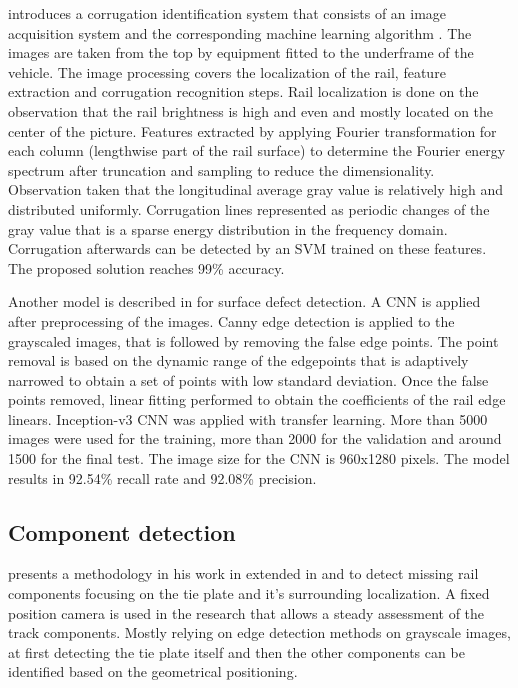 \documentclass[10pt, final]{article}
\begin{document}
			\citeauthor*{li_cyber-enabled_2018} introduces a corrugation identification system that consists of an image
			acquisition system and the corresponding machine learning algorithm \cite{li_cyber-enabled_2018}.
			The images are taken from the top by equipment fitted to the underframe of the vehicle.
			The image processing covers the localization of the rail, feature extraction and corrugation recognition steps.
			Rail localization is done on the observation that the rail brightness is high and even and mostly located on the
			center of the picture.
			Features extracted by applying Fourier transformation for each column (lengthwise part of the rail surface) to 
			determine the Fourier energy spectrum after truncation and sampling to reduce the dimensionality.
			Observation taken that the longitudinal average gray value is relatively high and distributed uniformly.
			Corrugation lines represented as periodic changes of the gray value that is a sparse energy distribution
			in the frequency domain.
			Corrugation afterwards can be detected by an SVM trained on these features.
			The proposed solution reaches 99\% accuracy.
			
			Another model is described in \cite{shang_detection_2018} for surface defect detection.
			A CNN is applied after preprocessing of the images.
			Canny edge detection is applied to the grayscaled images, that is followed by removing the false edge points.
			The point removal is based on the dynamic range of the edgepoints that is adaptively narrowed to obtain
			a set of points with low standard deviation.
			Once the false points removed, linear fitting performed to obtain the coefficients of the rail edge linears.
			Inception-v3 CNN was applied with transfer learning.
			More than 5000 images were used for the training, more than 2000 for the validation and around 1500 for the final test.
			The image size for the CNN is 960x1280 pixels.
			The model results in 92.54\% recall rate and 92.08\% precision.

		\subsection{Component detection}
			\citeauthor{li_component-based_2011} presents a methodology in his work in \cite{li_component-based_2011} 
			extended in \cite{trinh_enhanced_2012} and \cite{ying_li_rail_2014} to detect missing rail components 
			focusing on the tie plate and it's surrounding localization.
			A fixed position camera is used in the research that allows a steady assessment of the track components.
			Mostly relying on edge detection methods on grayscale images, 
			at first detecting the tie plate itself and then the other components can be identified 
			based on the geometrical positioning.
\end{document}

